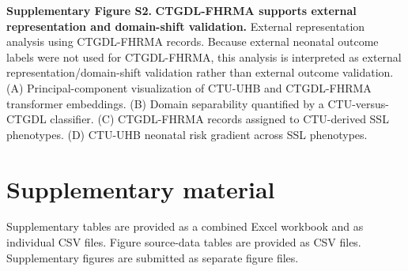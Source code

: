 \documentclass[11pt]{article}
\begin{document}
\noindent\textbf{Supplementary Figure S2.} \textbf{CTGDL-FHRMA supports external representation and domain-shift validation.}
  External representation analysis using CTGDL-FHRMA records. Because external neonatal outcome labels were not used for CTGDL-FHRMA, this analysis is interpreted as external representation/domain-shift validation rather than external outcome validation. (A) Principal-component visualization of CTU-UHB and CTGDL-FHRMA transformer embeddings. (B) Domain separability quantified by a CTU-versus-CTGDL classifier. (C) CTGDL-FHRMA records assigned to CTU-derived SSL phenotypes. (D) CTU-UHB neonatal risk gradient across SSL phenotypes.


        \section*{Supplementary material}
        Supplementary tables are provided as a combined Excel workbook and as individual CSV files. Figure source-data tables are provided as CSV files. Supplementary figures are submitted as separate figure files.
\end{document}
